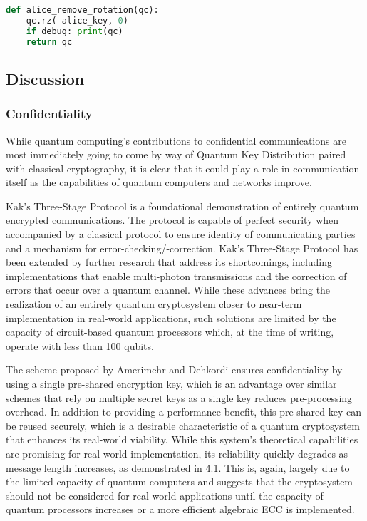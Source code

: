 \documentclass[sigconf]{acmart}
\begin{document}
\begin{lstlisting}[caption={Implementation, Step 5 (Partial)},label={lst:kak_s5},language=Python]
def alice_remove_rotation(qc):
    qc.rz(-alice_key, 0)
    if debug: print(qc)
    return qc
\end{lstlisting}

\subsection{Discussion}
\subsubsection{Confidentiality}
While quantum computing's contributions to confidential communications are most immediately going to come by way of Quantum Key Distribution paired with classical cryptography, it is clear that it could play a role in communication itself as the capabilities of quantum computers and networks improve.

Kak's Three-Stage Protocol is a foundational demonstration of entirely quantum encrypted communications. The protocol is capable of perfect security when accompanied by a classical protocol to ensure identity of communicating parties and a mechanism for error-checking/-correction\cite{kak_three-stage_2006}. Kak's Three-Stage Protocol has been extended by further research that address its shortcomings, including implementations that enable multi-photon transmissions\cite{mandal_multi-photon_2013} and the correction of errors that occur over a quantum channel\cite{parakh_correcting_2016}. While these advances bring the realization of an entirely quantum cryptosystem closer to near-term implementation in real-world applications, such solutions are limited by the capacity of circuit-based quantum processors which, at the time of writing, operate with less than 100 qubits\cite{noauthor_ibms_2020, arute_quantum_2019}.

The scheme proposed by Amerimehr and Dehkordi ensures confidentiality by using a single pre-shared encryption key, which is an advantage over similar schemes that rely on multiple secret keys as a single key reduces pre-processing overhead\cite{amerimehr_quantum_2018}. In addition to providing a performance benefit, this pre-shared key can be reused securely, which is a desirable characteristic of a quantum cryptosystem that enhances its real-world viability. While this system's theoretical capabilities are promising for real-world implementation, its reliability quickly degrades as message length increases, as demonstrated in 4.1. This is, again, largely due to the limited capacity of quantum computers and suggests that the cryptosystem should not be considered for real-world applications until the capacity of quantum processors increases or a more efficient algebraic ECC is implemented.
\end{document}
